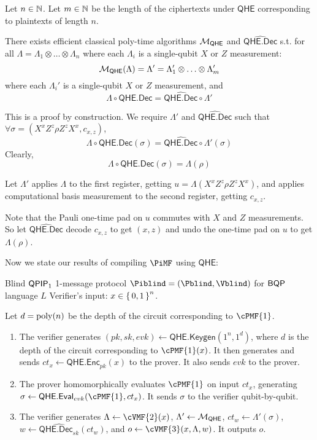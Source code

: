 \begin{thm}
	\label{decodeMeasureOrder}
	Let $n\in\mathbb{N}$.
	Let $m\in\mathbb{N}$ be the length of the ciphertexts under $\mathsf{QHE}$ corresponding to plaintexts of length $n$.

	There exists efficient classical poly-time algorithms ${\cal M}_{\mathsf{QHE}}$ and $\widehat{\mathsf{QHE.Dec}}$ s.t.
	for all $\Lambda=\Lambda_1\otimes\ldots\otimes\Lambda_n$ where each $\Lambda_i$ is a single-qubit $X$ or $Z$ measurement:
	$${\cal M}_{\mathsf{QHE}}(\Lambda)=\Lambda'=\Lambda'_1\otimes\ldots\otimes\Lambda'_m$$
	where each $\Lambda_i'$ is a single-qubit $X$ or $Z$ measurement, and
	$$\Lambda\circ\mathsf{QHE.Dec}=\widehat{\mathsf{QHE.Dec}}\circ\Lambda'$$
\end{thm}
\begin{prf}
	This is a proof by construction.
	We require $\Lambda'$ and $\widehat{\mathsf{QHE.Dec}}$ such that $\forall\sigma=(X^xZ^z\rho Z^zX^x, c_{x,z})$,
	$$\Lambda\circ\mathsf{QHE.Dec}(\sigma)=\widehat{\mathsf{QHE.Dec}}\circ\Lambda'(\sigma)$$
	Clearly,
	$$\Lambda\circ\mathsf{QHE.Dec}(\sigma)=\Lambda(\rho)$$
	
	Let $\Lambda'$ applies $\Lambda$ to the first register, getting $u=\Lambda(X^xZ^z\rho Z^zX^x)$, and applies computational basis measurement to the second register, getting $c_{x, z}$.

	Note that the Pauli one-time pad on $u$ commutes with $X$ and $Z$ measurements.
	So let $\widehat{\mathsf{QHE.Dec}}$ decode $c_{x, z}$ to get $(x, z)$ and undo the one-time pad on $u$ to get $\Lambda(\rho)$.
\end{prf}

Now we state our results of compiling $\PiMF$ using $\mathsf{QHE}$:

\begin{protocol}{Blind $\operatorname{\mathsf{QPIP}}_1$ 1-message protocol $\Piblind = (\Pblind, \Vblind)$ for $\operatorname{\mathsf{BQP}}$ language $L$}
	\label{proto:BlindBQP}
	Verifier's input: $x\in\set{0,1}^n$.
	
	Let $d=\operatorname*{\operatorname{poly}}(n)$ be the depth of the circuit corresponding to $\cPMF{1}$.
	\begin{enumerate}
		\item The verifier generates $(pk, sk, evk)\leftarrow\mathsf{QHE.Keygen}(1^n, 1^d)$, where $d$ is the depth of the circuit corresponding to $\cPMF{1}(x)$.
			It then generates and sends $ct_x\leftarrow\mathsf{QHE.Enc}_{pk}(x)$ to the prover.
			It also sends $evk$ to the prover.
		\item The prover homomorphically evaluates $\cPMF{1}$ on input $ct_x$, generating $\sigma\leftarrow\mathsf{QHE.Eval}_{evk}(\cPMF{1}, ct_x)$.
			It sends $\sigma$ to the verifier qubit-by-qubit.
		\item The verifier generates $\Lambda\leftarrow\cVMF{2}(x)$,
			$\Lambda'\leftarrow{\cal M}_{\mathsf{QHE}}$,
			$ct_w\leftarrow\Lambda'(\sigma)$,
			$w\leftarrow\widehat{\mathsf{QHE.Dec}_{sk}}(ct_w)$,
			and $o\leftarrow\cVMF{3}(x, \Lambda, w)$.
			It outputs $o$.
	\end{enumerate}
\end{protocol}

